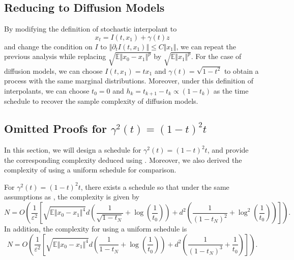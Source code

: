 

\subsection{Reducing to Diffusion Models}
\label{appendix:reduce-to-gaussian}

By modifying the definition of stochastic interpolant to $$x_t=I(t,x_1)+\gamma(t)z$$
and change the condition on $I$ to $\Vert\partial_tI(t,x_1)\Vert\le C\Vert x_1\Vert$, we can repeat the previous analysis while replacing $\sqrt{\mathbb{E}\Vert x_0-x_1\Vert^p}$ by $\sqrt{\mathbb{E}\Vert x_1\Vert^p}$. For the case of diffusion models, we can choose $I(t,x_1)=tx_1$ and $\gamma(t)=\sqrt{1-t^2}$ to obtain a process with the same marginal distributions. Moreover, under this definition of interpolants, we can choose $t_0=0$ and $h_k=t_{k+1}-t_k\propto(1-t_k)$ as the time schedule to recover the sample complexity of diffusion models.

\subsection{Omitted Proofs for $\gamma^2(t)=(1-t)^2t$}
\label{appendix:another}

In this section, we will design a schedule for $\gamma^2(t)=(1-t)^2t$, and provide the corresponding complexity deduced using . Moreover, we also derived the complexity of using a uniform schedule for comparison.

\begin{corollary}
    For $\gamma^2(t)=(1-t)^2t$, there exists a schedule so that under the same assumptions as , the complexity is given by
    $$N=O\left(\frac{1}{\varepsilon^2}\left[\sqrt{\mathbb{E}\Vert x_0-x_1\Vert^4}d\left(\frac{1}{\sqrt{1-t_N}}+\log\left(\frac{1}{t_0}\right)\right)+d^2\left(\frac{1}{(1-t_N)^2}+\log^2\left(\frac{1}{t_0}\right)\right)\right]\right).$$
    In addition, the complexity for using a uniform schedule is $$N=O\left(\frac{1}{\varepsilon^2}\left[\sqrt{\mathbb{E}\Vert x_0-x_1\Vert^4}d\left(\frac{1}{1-t_N}+\log\left(\frac{1}{t_0}\right)\right)+d^2\left(\frac{1}{(1-t_N)^3}+\frac{1}{t_0}\right)\right]\right).$$
\end{corollary}

